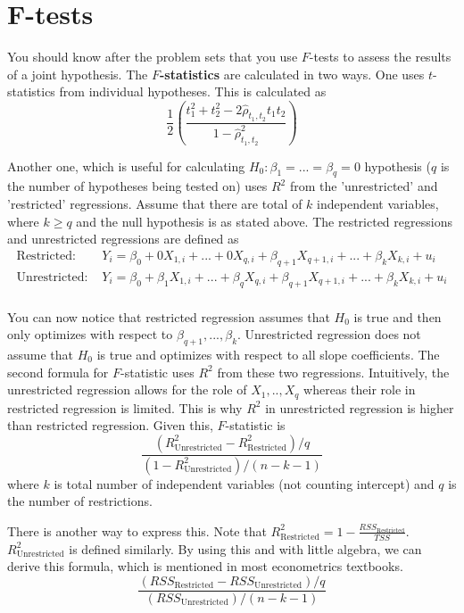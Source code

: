 \section{F-tests}
You should know after the problem sets that you use $F$-tests to assess the results of a joint hypothesis. The \textbf{$F$-statistics} are calculated in two ways. One uses $t$-statistics from individual hypotheses. This is calculated as
\[
\frac{1}{2}\left(\frac{t_1^2+t_2^2-2\hat{\rho}_{t_1,t_2}t_1t_2}{1-\hat{\rho}^2_{t_1,t_2}}\right)
\]\par\medskip
Another one, which is useful for calculating $H_0: \beta_1 = ... =\beta_q=0$ hypothesis ($q$ is the number of hypotheses being tested on) uses $R^2$ from the 'unrestricted' and 'restricted' regressions. Assume that there are total of $k$ independent variables, where $k\geq q$ and the null hypothesis is as stated above. The restricted regressions and unrestricted regressions are defined as
\[\begin{aligned}
\text{Restricted: } & Y_i =\beta_0+ 0X_{1,i} + ...+ 0X_{q,i}+ \beta_{q+1}X_{q+1,i}+...+\beta_kX_{k,i} + u_i\\
\text{Unrestricted: } & Y_i = \beta_0+\beta_1X_{1,i} + ... +\beta_qX_{q,i}+ \beta_{q+1}X_{q+1,i}+...+\beta_kX_{k,i} + u_i\\
\end{aligned}\] \par\medskip
You can now notice that restricted regression assumes that $H_0$ is true and then only optimizes with respect to $\beta_{q+1},...,\beta_{k}$. Unrestricted regression does not assume that $H_0$ is true and optimizes with respect to all slope coefficients. The second formula for $F$-statistic uses $R^2$ from these two regressions. Intuitively, the unrestricted regression allows for the role of $X_1,..,X_q$ whereas their role in restricted regression is limited. This is why $R^2$ in unrestricted regression is higher than restricted regression. Given this, $F$-statistic is
\[
\frac{(R^2_{\text{Unrestricted}}-R^2_{\text{Restricted}})/q}{(1-R^2_{\text{Unrestricted}})/(n-k-1)}
\]
where $k$ is total number of independent variables (not counting intercept) and $q$ is the number of restrictions. \par\medskip
There is another way to express this. Note that $R^2_{\text{Restricted}} = 1-\frac{RSS_{\text{Restricted}}}{TSS}$. $R^2_{\text{Unrestricted}}$ is defined similarly. By using this and with little algebra, we can derive this formula, which is mentioned in most econometrics textbooks.
\[
\frac{(RSS_{\text{Restricted}}-RSS_{\text{Unrestricted}})/q}{(RSS_{\text{Unrestricted}})/(n-k-1)}
\] \par\medskip


